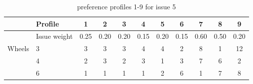 \documentclass[11pt,a4paper]{report}
\begin{document}
\begin{table}[H]
\centering
\caption{preference profiles 1-9 for issue 5}
\label{tab:issue5}
\begin{tabular}{|p{3cm}|p{3cm}||c|c|c|c|c|c|c|c|c|}
\hline
&Profile & 1 & 2 & 3 & 4 & 5 & 6 & 7 & 8 & 9 \\
\hline
&Issue weight& 0.25 & 0.20 & 0.20 & 0.15 & 0.20 & 0.15 & 0.60 & 0.50 & 0.20 \\
\hline
\hline
Wheels &3   & 3 & 3 &3 &4 &4 &2 &8 &1 &12 \\
       &4   & 2 & 3 &2 &3 &1 &3 &7 &6 &2 \\
       &6   & 1 & 1 &1 &1 &2 &6 &1 &7 &8 \\
\hline
\end{tabular}
\end{table}
\end{document}
